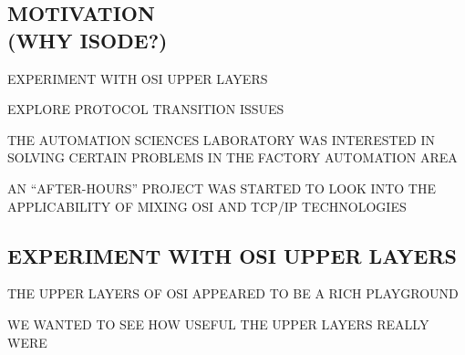 \begin{bwslide}
\part	{MOTIVATION\\ (WHY ISODE?)}\bf

\begin{nrtc}
\item	EXPERIMENT WITH OSI UPPER LAYERS

\item	EXPLORE PROTOCOL TRANSITION ISSUES
\end{nrtc}
\end{bwslide}


\begin{bwslide}

\begin{nrtc}
\item	THE AUTOMATION SCIENCES LABORATORY WAS INTERESTED IN SOLVING CERTAIN
	PROBLEMS IN THE FACTORY AUTOMATION AREA

\item	AN ``AFTER-HOURS'' PROJECT WAS STARTED TO LOOK INTO THE APPLICABILITY
	OF MIXING OSI AND TCP/IP TECHNOLOGIES
\end{nrtc}
\end{bwslide}


\begin{bwslide}
\part*	{EXPERIMENT WITH OSI UPPER LAYERS}\bf

\begin{nrtc}
\item	THE UPPER LAYERS OF OSI APPEARED TO BE A RICH PLAYGROUND

\item	WE WANTED TO SEE HOW USEFUL THE UPPER LAYERS REALLY WERE
\end{nrtc}
\end{bwslide}




